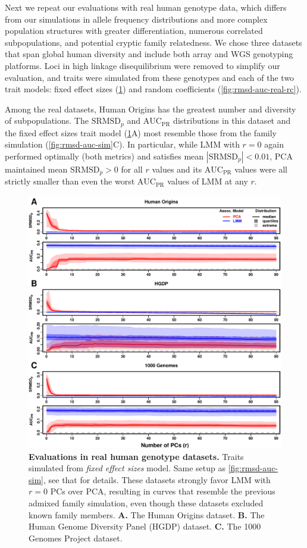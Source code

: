 \documentclass[11pt]{article}
\newcommand{\rmsd}{\text{SRMSD}_p}
\newcommand{\auc}{\text{AUC}_\text{PR}}
\begin{document}
Next we repeat our evaluations with real human genotype data, which differs from our simulations in allele frequency distributions and more complex population structures with greater differentiation, numerous correlated subpopulations, and potential cryptic family relatedness.
We chose three datasets that span global human diversity and include both array and WGS genotyping platforms.
Loci in high linkage disequilibrium were removed to simplify our evaluation, and traits were simulated from these genotypes and each of the two trait models: fixed effect sizes (\cref{fig:rmsd-auc-real}) and random coefficients (\cref{fig:rmsd-auc-real-rc}).

Among the real datasets, Human Origins has the greatest number and diversity of subpopulations.
The $\rmsd$ and $\auc$ distributions in this dataset and the fixed effect sizes trait model (\cref{fig:rmsd-auc-real}A) most resemble those from the family simulation (\cref{fig:rmsd-auc-sim}C).
In particular, while LMM with $r=0$ again performed optimally (both metrics) and satisfies mean $|\rmsd| < 0.01$, PCA maintained mean $\rmsd > 0$ for all $r$ values and its $\auc$ values were all strictly smaller than even the worst $\auc$ values of LMM at any $r$.

\begin{figure}[bp!]
  \centering
  \includegraphics[width=\textwidth,height=\textheight,keepaspectratio]{fes/rmsd-auc-real.pdf}
  \caption{
    {\small 
      {\bf Evaluations in real human genotype datasets.}
      Traits simulated from \textit{fixed effect sizes} model.
      Same setup as \cref{fig:rmsd-auc-sim}, see that for details.
      These datasets strongly favor LMM with $r = 0$ PCs over PCA, resulting in curves that resemble the previous admixed family simulation, even though these datasets excluded known family members.
      \textbf{A.}
      The Human Origins dataset.
      \textbf{B.}
      The Human Genome Diversity Panel (HGDP) dataset.
      \textbf{C.}
      The 1000 Genomes Project dataset.
    }
  }
  \label{fig:rmsd-auc-real}
\end{figure}
\end{document}
